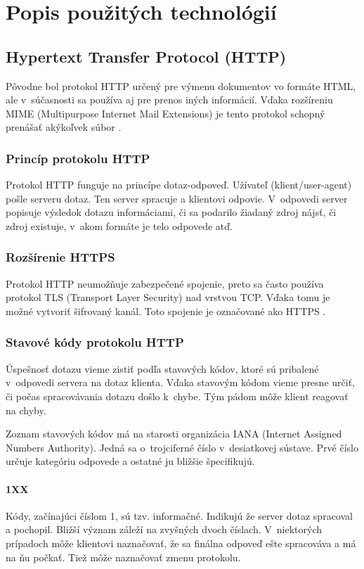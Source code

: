 \documentclass[slovak]{fitthesis}
\begin{document}
\chapter{Popis použitých technológií}\label{technologie}


\section{Hypertext Transfer Protocol (HTTP)}\label{http}
Pôvodne bol protokol HTTP určený pre výmenu dokumentov vo formáte HTML, ale v~súčasnosti sa používa aj pre prenos iných informácií. Vďaka rozšíreniu MIME (Multipurpose Internet Mail Extensions) je tento protokol schopný prenášať akýkoľvek súbor \cite{httpRFC}.

\subsection{Princíp protokolu HTTP}
Protokol HTTP funguje na princípe dotaz-odpoveď. Užívateľ (klient/user-agent) pošle serveru dotaz. Ten server spracuje a klientovi odpovie. V~odpovedi server popisuje výsledok dotazu informáciami, či sa podarilo žiadaný zdroj nájsť, či zdroj existuje, v~akom formáte je telo odpovede atď.


\subsection{Rozšírenie HTTPS}
Protokol HTTP neumožňuje zabezpečené spojenie, preto sa často používa protokol TLS (Transport Layer Security) nad vrstvou TCP. Vďaka tomu je možné vytvoriť šifrovaný kanál. Toto spojenie je označované ako HTTPS \cite{httpsRFC}.


\subsection{Stavové kódy protokolu HTTP}
Úspešnosť dotazu vieme zistiť podľa stavových kódov, ktoré sú pribalené v~odpovedi servera na dotaz klienta. Vďaka stavovým kódom vieme presne určiť, či počas spracovávania dotazu došlo k~chybe. Tým pádom môže klient reagovať na chyby.

Zoznam stavových kódov má na starosti organizácia IANA (Internet Assigned Numbers Authority). Jedná sa o~trojciferné číslo v~desiatkovej sústave. Prvé číslo určuje kategóriu odpovede a ostatné ju bližšie špecifikujú.

\subsubsection{1XX}
Kódy, začínajúci číslom 1, sú tzv. informačné. Indikujú že server dotaz spracoval a pochopil. Bližší význam záleží na zvyšných dvoch číslach. V~niektorých prípadoch môže klientovi naznačovať, že sa finálna odpoveď ešte spracováva a má na ňu počkať. Tiež môže naznačovať zmenu protokolu.
\end{document}
